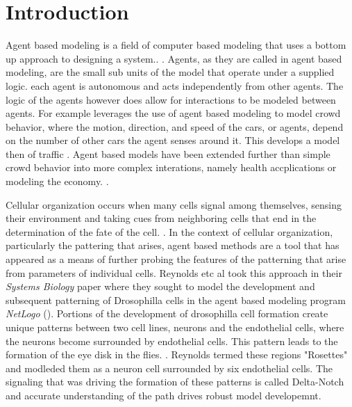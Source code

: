 \documentclass[12pt]{ifacconf}
\begin{document}
\section{Introduction}
Agent based modeling is a field of computer based modeling that uses a bottom up approach to designing a system.. \cite{Bon:02}. Agents, as they are called in agent based modeling, are the small sub units of the model that operate under a supplied logic. each agent is autonomous and acts independently from other agents. The logic of the agents however does allow for interactions to be modeled between agents. For example \citet{DB:08} leverages the use of agent based modeling to model crowd behavior, where the motion, direction, and speed of the cars, or agents, depend on the number of other cars the agent senses around it. This develops a model then of traffic \cite{DB:08}. Agent based models have been extended further than simple crowd behavior into more complex interations, namely health accplications or modeling the economy. \cite{FE:09}.

Cellular organization occurs when many cells signal among themselves, sensing their environment and taking cues from neighboring cells that end in the determination of the fate of the cell. \cite{KI:93}. In the context of cellular organization, particularly the pattering that arises, agent based methods are a tool that has appeared as a means of further probing the features of the patterning that arise from parameters of individual cells. Reynolds etc al took this approach in their \emph{Systems Biology} paper where they sought to model the development and subsequent patterning of Drosophilla cells in the agent based modeling program \emph{NetLogo} (\cite{RAB:19}). Portions of the development of drosophilla cell formation create unique patterns between two cell lines, neurons and the endothelial cells, where the neurons become surrounded by endothelial cells. This pattern leads to the formation of the eye disk in the flies. \cite{KI:93}. Reynolds termed these regions "Rosettes" and modleded them as a neuron cell surrounded by six endothelial cells. The signaling that was driving the formation of these patterns is called Delta-Notch and accurate understanding of the path drives robust model developemnt. 
\end{document}
